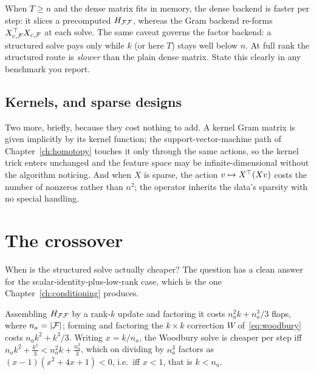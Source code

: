 \begin{remark}
When $T \ge n$ and the dense matrix fits in memory, the dense backend is faster per
step: it slices a precomputed $H_{\mathcal{F}\mathcal{F}}$, whereas the Gram backend re-forms
$X_{c,\mathcal{F}}^{\top} X_{c,\mathcal{F}}$ at each solve. The same caveat governs the factor backend:
a structured solve pays only while $k$ (or here $T$) stays well below $n$. At full
rank the structured route is \emph{slower} than the plain dense matrix. State this
clearly in any benchmark you report.
\end{remark}

\subsection{Kernels, and sparse designs}

Two more, briefly, because they cost nothing to add. A kernel Gram matrix is given
implicitly by its kernel function; the support-vector-machine path of
Chapter~\ref{ch:homotopy} touches it only through the same actions, so the kernel trick
enters unchanged and the feature space may be infinite-dimensional without the
algorithm noticing. And when $X$ is sparse, the action $v \mapsto X^{\top}(Xv)$ costs the
number of nonzeros rather than $n^2$; the operator inherits the data's sparsity with no
special handling.

\section{The crossover}

When is the structured solve actually cheaper? The question has a clean answer for the
scalar-identity-plus-low-rank case, which is the one Chapter~\ref{ch:conditioning}
produces.

\begin{proposition}
\label{prop:crossover}
Assembling $H_{\mathcal{F}\mathcal{F}}$ by a rank-$k$ update and factoring it costs
$n_a^2 k + n_a^3/3$ flops, where $n_a = |\mathcal{F}|$; forming and factoring the $k\times k$
correction $W$ of~\eqref{eq:woodbury} costs $n_a k^2 + k^3/3$. Writing $x = k/n_a$, the
Woodbury solve is cheaper per step iff
$n_a k^2 + \tfrac{k^3}{3} < n_a^2 k + \tfrac{n_a^3}{3}$, which on dividing by $n_a^3$
factors as $(x-1)(x^2 + 4x + 1) < 0$, i.e.\ iff $x < 1$, that is $k < n_a$.
\end{proposition}

